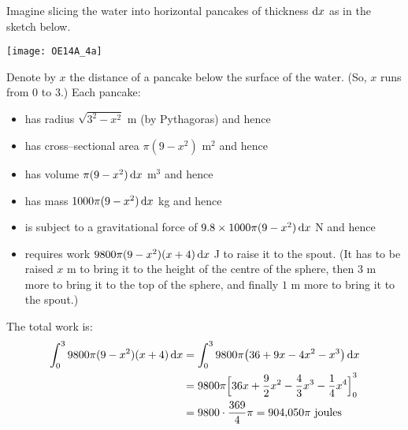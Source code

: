\begin{solution}
Imagine slicing the water into horizontal pancakes of thickness $\mathrm{d}x$ as in the sketch below.

\begin{center}
       \texttt{[image: OE14A\_4a]}
\end{center}

\noindent
Denote by $x$ the distance of a pancake below the surface of
the water. (So, $x$ runs from $0$ to $3$.) Each pancake:
\begin{itemize}
\item has radius $\sqrt{3^2-x^2}$ m (by Pythagoras) and hence
\item has cross--sectional area $\pi (9-x^2)$ m$^2$ and hence
\item has volume $\pi (9-x^2)\,\mathrm{d}x$ m$^3$ and hence
\item has mass $1000 \pi (9-x^2)\,\mathrm{d}x$ kg and hence
\item is subject to a gravitational force of
$9.8\times 1000 \pi (9-x^2)\,\mathrm{d}x$ N and hence
\item requires work $9800 \pi (9-x^2)(x+4)\,\mathrm{d}x$ J
to raise it to the spout.
(It has to be raised $x$ m to bring it to the height of the centre
of the sphere, then $3$ m more to bring it to the top of the sphere,
and finally $1$ m more to bring it to the spout.)
\end{itemize}
The total work is:
\begin{align*}
\int_0^3 9800 \pi (9-x^2)(x+4)\,\mathrm{d}x
&=\int_0^3 9800 \pi \big(36+9x-4x^2-x^3\big)\,\mathrm{d}x \\
&=9800 \pi{\Big[36x+\frac{9}{2}x^2-\frac{4}{3}x^3-\frac{1}{4}x^4\Big]}_0^3\\
&=9800\cdot\frac{369}{4} \pi
=904{,}050\pi
\ \text{joules}
\end{align*}
\end{solution}




